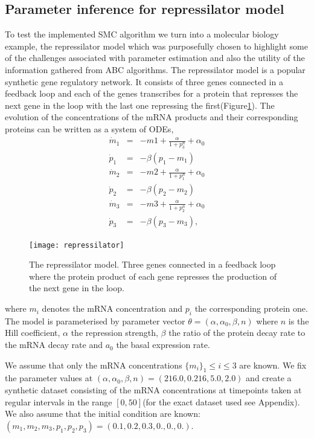 \subsection{Parameter inference for repressilator model}
To test the implemented SMC algorithm we turn into a molecular biology example, the repressilator model which was purposefully chosen to highlight some of the challenges associated with parameter estimation and also the utility of the information gathered from ABC algorithms. The repressilator model\cite[] {garcia2004modeling} is a popular synthetic gene regulatory network. It consists of three genes connected in a feedback loop and each of the genes transcribes for a protein that represses the next gene in the loop with the last one repressing the first(Figure\ref{fig:repressilator}). The evolution of the concentrations of the mRNA products and their corresponding proteins can be written as a system of ODEs,
\begin{equation}
\begin{array}{lcl}
\dot m_1 & = & -m1 + \frac{\alpha}{1 + p_{3}^{n}} + \alpha_0 \\
\dot p_1& = & -\beta(p_1 - m_1) \\
\dot m_2 & = & -m2 + \frac{\alpha}{1 + p_{1}^{n}} + \alpha_0 \\
\dot p_2 & = & -\beta(p_2 - m_2)\\
\dot m_3 & = & -m3 + \frac{\alpha}{1 + p_{2}^{n}} + \alpha_0 \\
\dot p_3 & = & -\beta(p_3 - m_3),
\end{array}
\end{equation} 
\begin{figure}
\centering
\texttt{[image: repressilator]}
\caption{The repressilator model. Three genes connected in a feedback loop where the protein product of each gene represses the production of the next gene in the loop.}
\label{fig:repressilator}
\end{figure}
where $m_i$ denotes the mRNA concentration and $p_i$ the corresponding protein one.  The model is parameterised by parameter vector $\theta = (\alpha, \alpha_0, \beta, n)$ where $n$ is the Hill coefficient, $\alpha$ the repression strength, $\beta$ the ratio of the protein decay rate to the mRNA decay rate and $a_0$ the basal expression rate. 

We assume that only the mRNA concentrations $\{m_i\}_1 \le i \le 3$ are known. We fix the parameter values at $(\alpha, \alpha_0, \beta, n) = (216.0, 0.216, 5.0, 2.0)$ and create a synthetic dataset consisting of the mRNA concentrations at timepoints taken at regular intervals in the range $[0, 50]$(for the exact dataset used see Appendix). We also assume that the initial condition are known: $(m_1, m_2, m_3, p_1, p_2, p_3) = (0.1, 0.2, 0.3, 0., 0., 0.)$.

